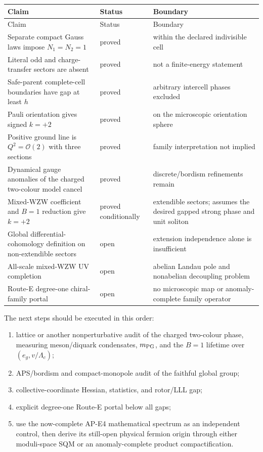 \documentclass[11pt]{article}
\theoremstyle{definition}
\theoremstyle{remark}
\newcommand{\cO}{\mathcal O}
\newcommand{\status}[1]{\textcolor{blue!60!black}{\textsf{#1}}}
\begin{document}
\begingroup
\small
\begin{longtable}{@{}L{0.40\textwidth}L{0.19\textwidth}L{0.32\textwidth}@{}}
\toprule
Claim & Status & Boundary\\
\midrule
\endfirsthead
\toprule
Claim & Status & Boundary\\
\midrule
\endhead
Separate compact Gauss laws impose \(N_1=N_2=1\) & \status{proved} & within
the declared indivisible cell\\
Literal odd and charge-transfer sectors are absent & \status{proved} & not a
finite-energy statement\\
Safe-parent complete-cell boundaries have gap at least \(h\) &
\status{proved} & arbitrary intercell phases excluded\\
Pauli orientation gives signed \(k=+2\) & \status{proved} & on the microscopic
orientation sphere\\
Positive ground line is \(Q^2=\cO(2)\) with three sections &
\status{proved} & family interpretation not implied\\
Dynamical gauge anomalies of the charged two-colour model cancel &
\status{proved} & discrete/bordism refinements remain\\
Mixed-WZW coefficient and \(B=1\) reduction give \(k=+2\) &
\status{proved conditionally} & extendible sectors; assumes the desired gapped
strong phase and unit soliton\\
Global differential-cohomology definition on non-extendible sectors &
\status{open} & extension independence alone is insufficient\\
All-scale mixed-WZW UV completion & \status{open} & abelian Landau pole and
nonabelian decoupling problem\\
Route-E degree-one chiral-family portal & \status{open} & no microscopic map
or anomaly-complete family operator\\
\bottomrule
\end{longtable}
\endgroup

The next steps should be executed in this order:
\begin{enumerate}
\item lattice or another nonperturbative audit of the charged two-colour
  phase, measuring meson/diquark condensates, \(m_{\rm PG}\), and the
  \(B=1\) lifetime over \((e_g,v/\Lambda_c)\);
\item APS/bordism and compact-monopole audit of the faithful global group;
\item collective-coordinate Hessian, statistics, and rotor/LLL gap;
\item explicit degree-one Route-E portal below all gaps;
\item use the now-complete AP-E4 mathematical spectrum as an independent
  control, then derive its still-open physical fermion origin through either
  moduli-space SQM or an anomaly-complete product compactification.
\end{enumerate}
\end{document}
